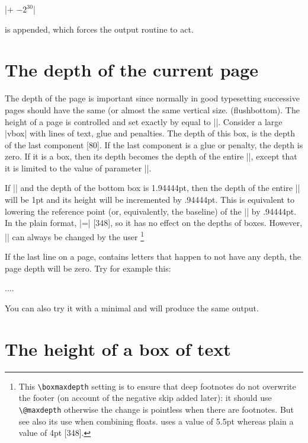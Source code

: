 |\hbox{}\vfill\penalty+ $-2^{30}$|

is appended, which forces the output routine to act.

\section{The depth of the current page}
The depth of the page is important since normally in good typesetting successive pages should have the same (or almost the same vertical size. (flushbottom). The height of a page is controlled and set exactly by \tex equal to |\vsize|. Consider a large |vbox| with lines of text, glue and penalties. The depth of this box, is the depth of the last component [80]. If the last component is a glue or penalty, the depth is zero. If it is a box, then its depth becomes the depth of the entire |\vbox|, except that it is limited to the value of parameter |\boxmaxdepth|.

If
|\boxmaxdepth=1pt| and the depth of the bottom box
is 1.94444pt, then the depth of the entire |\vbox|
will be 1pt and its height will be incremented
by .94444pt. This is equivalent to lowering the
reference point (or, equivalently, the baseline) of
the |\vbox| by .94444pt. In the plain format,
|\boxmaxdepth=\maxdimen| [348], so it has no effect
on the depths of boxes. However, |\boxmaxdepth|
can always be changed by the user \footnote{This \texttt{\textbackslash boxmaxdepth} setting is to ensure that deep footnotes do not overwrite the
footer (on account of the negative skip added later): it should use \texttt{\textbackslash @maxdepth}
otherwise the change is pointless when there are footnotes.
But see also its use when combining 
floats.  \latex uses a value of 5.5pt whereas plain a value of 4pt [348].}



If the last line on a page, contains letters that happen to not have any depth, the page depth will be zero. Try for example this:

\begin{teXXX}
....
\showthe\pagedepth
\bye
\end{teXXX}

You can also try it with a \latex minimal and will produce the same output.


\section{The height of a box of text}

